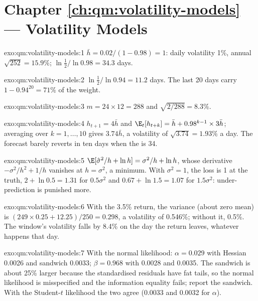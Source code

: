 \section*{Chapter \ref{ch:qm:volatility-models} --- Volatility Models}

\begin{solution}{exo:qm:volatility-models:1}
$\bar h = 0.02/(1 - 0.98) = 1$: daily volatility 1\%, annual $\sqrt{252} = 15.9\%$;  $\ln\frac12/\ln0.98 = 34.3$ days.
\end{solution}

\begin{solution}{exo:qm:volatility-models:2}
$\ln\frac12/\ln0.94 = 11.2$ days. The last 20 days carry $1 - 0.94^{20} = 71\%$ of the weight.
\end{solution}

\begin{solution}{exo:qm:volatility-models:3}
$m = 24 \times 12 = 288$ and $\sqrt{2/288} = 8.3\%$.
\end{solution}

\begin{solution}{exo:qm:volatility-models:4}
$h_{t+1} = 4\bar h$ and $\E_t[h_{t+k}] = \bar h + 0.98^{k-1} \times 3\bar h$; averaging over $k = 1, \dots, 10$ gives $3.74\bar h$, a volatility of $\sqrt{3.74} = 1.93\%$
a day. The forecast barely reverts in ten days when the  is 34.
\end{solution}

\begin{solution}{exo:qm:volatility-models:5}
$\E[\hat\sigma^2/h + \ln h] = \sigma^2/h + \ln h$, whose derivative $-\sigma^2/h^2 + 1/h$ vanishes at $h = \sigma^2$, a minimum. With $\sigma^2 = 1$, the loss is 1 at the
truth, $2 + \ln0.5 = 1.31$ for $0.5\sigma^2$ and $0.67 + \ln1.5 = 1.07$ for $1.5\sigma^2$: under-prediction is punished more.
\end{solution}

\begin{solution}{exo:qm:volatility-models:6}
With the 3.5\% return, the variance (about zero mean) is $(249 \times 0.25 + 12.25)/250 = 0.298$, a volatility of 0.546\%; without it, 0.5\%. The window's
volatility falls by 8.4\% on the day the return leaves, whatever happens that day.
\end{solution}

\begin{solution}{exo:qm:volatility-models:7}
With the normal likelihood: $\alpha = 0.029$ with Hessian  0.0026 and sandwich 0.0033; $\beta = 0.968$ with 0.0028 and 0.0035. The sandwich is about 25\%
larger because the standardised residuals have fat tails, so the normal likelihood is misspecified and the information equality fails; report the sandwich.
With the Student-$t$ likelihood the two agree (0.0033 and 0.0032 for $\alpha$).
\end{solution}


